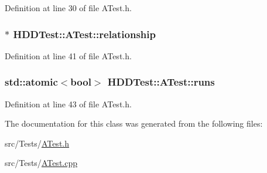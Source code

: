 Definition at line 30 of file A\-Test.\-h.

\hypertarget{class_h_d_d_test_1_1_a_test_a2c3b0b7b9ec6c37f8dce5cceba4b728e}{
\subsubsection[{relationship}]{$\ast$ H\-D\-D\-Test\-::\-A\-Test\-::relationship\hspace{0.3cm}{\ttfamily [protected]}}}\label{class_h_d_d_test_1_1_a_test_a2c3b0b7b9ec6c37f8dce5cceba4b728e}


Definition at line 41 of file A\-Test.\-h.

\hypertarget{class_h_d_d_test_1_1_a_test_a3b5cdf4b9fef9a7c74ec02755a08df24}{
\subsubsection[{runs}]{\setlength{\rightskip}{0pt plus 5cm}std\-::atomic$<$bool$>$ H\-D\-D\-Test\-::\-A\-Test\-::runs\hspace{0.3cm}{\ttfamily [protected]}}}\label{class_h_d_d_test_1_1_a_test_a3b5cdf4b9fef9a7c74ec02755a08df24}


Definition at line 43 of file A\-Test.\-h.



The documentation for this class was generated from the following files\-:\begin{DoxyCompactItemize}
\item 
src/\-Tests/\hyperlink{_a_test_8h}{A\-Test.\-h}\item 
src/\-Tests/\hyperlink{_a_test_8cpp}{A\-Test.\-cpp}\end{DoxyCompactItemize}
